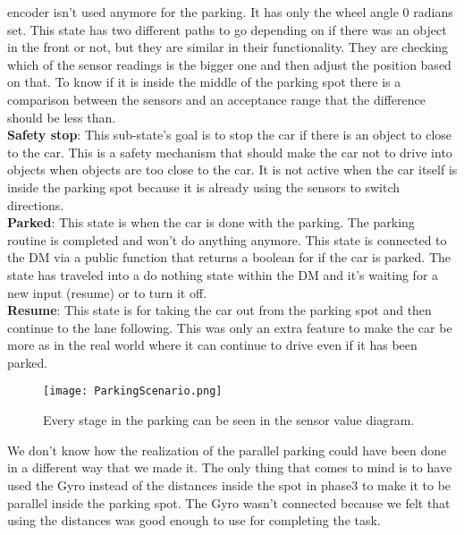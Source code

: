 encoder isn't used anymore for the parking. It has only the wheel angle 0
radians set. This state has two different paths to go depending on if there was
an object in the front or not, but they are similar in their functionality. They
are checking which of the sensor readings is the bigger one and then adjust the
position based on that. To know if it is inside the middle of the parking spot
there is a comparison between the sensors and an acceptance range that the
difference should be less than.\\
\textbf{Safety stop}: This sub-state's goal is to stop the car if there is an
object to close to the car. This is a safety mechanism that should make the car
not to drive into objects when objects are too close to the car. It is not
active when the car itself is inside the parking spot because it is already
using the sensors to switch directions.\\

\noindent
\textbf{Parked}: This state is when the car is done with the parking. The
parking routine is completed and won't do anything anymore. This state is
connected to the DM via a public function that returns a boolean for if the car
is parked. The state has traveled into a do nothing state within the DM and it's
waiting for a new input (resume) or to turn it off.\\

\noindent
\textbf{Resume}: This state is for taking the car out from the parking spot and
then continue to the lane following. This was only an extra feature to make the
car be more as in the real world where it can continue to drive even if it has
been parked.
\begin{figure}[ht]
  \centering
  \texttt{[image: ParkingScenario.png]}
  \caption{Every stage in the parking can be seen in the sensor value diagram.}
  \label{parkingscen}
\end{figure}
We don't know how the realization of the parallel parking could have been done
in a different way that we made it. The only thing that comes to mind is to have
used the Gyro instead of the distances inside the spot in phase3 to make it to
be parallel inside the parking spot. The Gyro wasn't connected because we felt
that using the distances was good enough to use for completing the task.